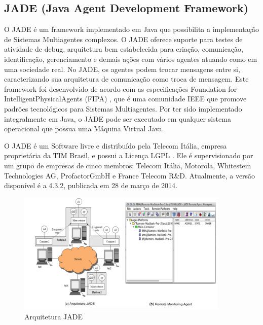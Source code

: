 \subsection{JADE (Java Agent Development Framework)}

O JADE \cite{telecon2014} é um framework implementado em Java que possibilita a implementação de Sistemas Multiagentes complexos. O JADE oferece suporte para testes de atividade de debug, arquitetura bem estabelecida para criação, comunicação, identificação, gerenciamento e demais ações com vários agentes atuando como em uma sociedade real. No JADE, os agentes podem trocar mensagens entre si, caracterizando sua arquitetura de comunicação como troca de mensagem. Este framework foi desenvolvido de acordo com as especificações Foundation for IntelligentPhysicalAgents (FIPA) \cite{telecon2014}, que é uma comunidade IEEE que promove padrões tecnológicos para Sistemas Multiagentes. Por ter sido implementado integralmente em Java, o JADE pode ser executado em qualquer sistema operacional que possua uma Máquina Virtual Java.

O JADE é um Software livre e distribuído pela Telecom Itália, empresa proprietária da TIM Brasil, e possui a Licença LGPL \cite{telecon2014}. Ele é supervisionado por um grupo de empresas de cinco membros: Telecom Itália, Motorola, Whitestein Technologies AG, ProfactorGmbH e France Telecom R\&D. Atualmente, a versão disponível é a 4.3.2, publicada em 28 de março de 2014.

\begin{figure}[h]
\centering
\label{f08}
\includegraphics[width=0.9\textwidth]{figuras/f08}
\caption{Arquitetura JADE}

\end{figure}


